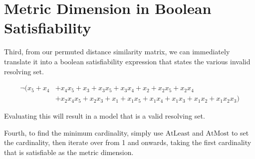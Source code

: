 \documentclass[12pt]{article}
\begin{document}
\newpage
\section*{Metric Dimension in Boolean Satisfiability}

Third, from our permuted distance similarity matrix, we can immediately translate it into a boolean satisfiability expression that states the various invalid resolving set.

\begin{align*}
	\neg ( x_5 + x_4 &+ x_4 x_5 + x_3 + x_3 x_5 + x_3 x_4 + x_2 + x_2 x_5 + x_2 x_4 \\ &+ x_2 x_4 x_5 + x_2 x_3 + x_1 + x_1 x_5 + x_1 x_4 + x_1 x_3 + x_1 x_2 + x_1 x_2 x_3 )
\end{align*}

Evaluating this will result in a model that is a valid resolving set.

Fourth, to find the minimum cardinality, simply use $\mathrm{AtLeast}$ and $\mathrm{AtMost}$ to set the cardinality, then iterate over from 1 and onwards, taking the first cardinality that is satisfiable as the metric dimension.
\end{document}
